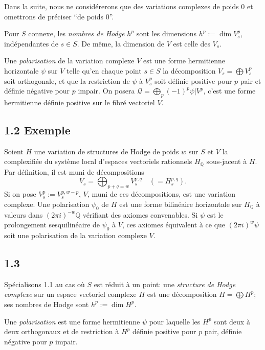 \documentclass[12pt,a4paper]{article}
\theoremstyle{plain}
\theoremstyle{definition}
\newcommand{\QQ}{\mathbb{Q}}
\begin{document}
Dans la suite, nous ne consid\'{e}rerons que des variations complexes de poids $0$ et omettrons de pr\'{e}ciser ``de poids $0$''.

Pour $S$ connexe, les \emph{nombres de Hodge} $h^{p}$ sont les dimensions $h^{p} := \dim V_{s}^{p}$, ind\'{e}pendantes de $s \in S$. De m\^{e}me, la dimension de $V$ est celle des $V_{s}$.

Une \emph{polarisation} de la variation complexe $V$ est une forme hermitienne horizontale $\psi$ sur $V$ telle qu'en chaque point $s \in S$ la d\'{e}composition $V_{s} = \bigoplus V_{s}^{p}$ soit orthogonale, et que la restriction de $\psi$ \`{a} $V_{s}^{p}$ soit d\'{e}finie positive pour $p$ pair et d\'{e}finie n\'{e}gative pour $p$ impair. On posera $\mathcal{Q} = \bigoplus_{p} (-1)^{p} \psi|V^{p}$, c'est une forme hermitienne d\'{e}finie positive sur le fibr\'{e} vectoriel $V$.

\subsection*{1.2 Exemple}
Soient $H$ une variation de structures de Hodge de poids $w$ sur $S$ et $V$ la complexifi\'{e}e du syst\`{e}me local d'espaces vectoriels rationnels $H_{\QQ}$ sous-jacent \`{a} $H$. Par d\'{e}finition, il est muni de d\'{e}compositions
\[
V_{s} = \bigoplus_{p+q=w} V_{s}^{p,q} \quad (= H_{s}^{p,q}).
\]
Si on pose $V_{s}^{p} := V_{s}^{p,w-p}$, $V$, muni de ces d\'{e}compositions, est une variation complexe. Une polarisation $\psi_{0}$ de $H$ est une forme bilin\'{e}aire horizontale sur $H_{\QQ}$ \`{a} valeurs dans $(2\pi i)^{-w}\QQ$ v\'{e}rifiant des axiomes convenables. Si $\psi$ est le prolongement sesquilin\'{e}aire de $\psi_{0}$ \`{a} $V$, ces axiomes \'{e}quivalent \`{a} ce que $(2\pi i)^{w}\psi$ soit une polarisation de la variation complexe $V$.

\subsection*{1.3}
Sp\'{e}cialisons 1.1 au cas o\`{u} $S$ est r\'{e}duit \`{a} un point: une \emph{structure de Hodge complexe} sur un espace vectoriel complexe $H$ est une d\'{e}composition $H = \bigoplus H^{p}$; ses nombres de Hodge sont $h^{p} := \dim H^{p}$.

Une \emph{polarisation} est une forme hermitienne $\psi$ pour laquelle les $H^{p}$ sont deux \`{a} deux orthogonaux et de restriction \`{a} $H^{p}$ d\'{e}finie positive pour $p$ pair, d\'{e}finie n\'{e}gative pour $p$ impair.
\end{document}
